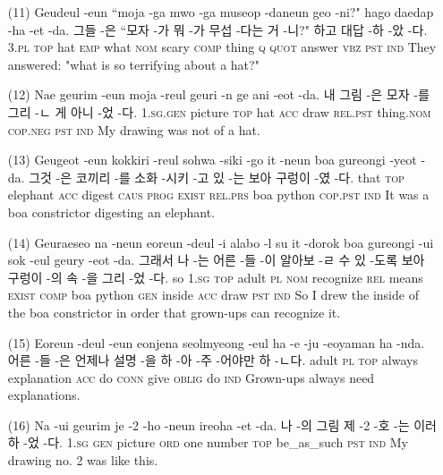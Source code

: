 \begin{itemize}
\item [(11)]
\tgl
		{Geudeul -eun ``moja -ga mwo -ga museop -daneun geo -ni?" hago daedap -ha -et -da.}
		{그들 -은 ``모자 -가 뭐 -가 무섭 -다는 거 -니?" 하고 대답 -하 -았 -다.}
		{\textsc{3.pl} \textsc{top} hat \textsc{emp} what \textsc{nom} scary \textsc{comp} thing \textsc{q} \textsc{quot} answer \textsc{vbz} \textsc{pst} \textsc{ind}}
		{They answered: "what is so terrifying about a hat?"}

\item [(12)]
\tgl
		{Nae geurim -eun moja -reul geuri -n ge ani -eot -da.}
		{내 그림 -은 모자 -를 그리 -ㄴ 게 아니 -었 -다.}
		{\textsc{1.sg.gen} picture \textsc{top} hat \textsc{acc} draw \textsc{rel.pst} thing.\textsc{nom} \textsc{cop.neg} \textsc{pst} \textsc{ind}}
		{My drawing was not of a hat.}

\item [(13)]
\tgl
		{Geugeot -eun kokkiri -reul sohwa -siki -go it -neun boa gureongi -yeot -da.}
		{그것 -은 코끼리 -를 소화 -시키 -고 있 -는 보아 구렁이 -였 -다.}
		{that \textsc{top} elephant \textsc{acc} digest \textsc{caus} \textsc{prog} \textsc{exist} \textsc{rel.prs} boa python \textsc{cop.pst} \textsc{ind}}
		{It was a boa constrictor digesting an elephant.}

\item [(14)]
\tgl
		{Geuraeseo na -neun eoreun -deul -i alabo -l su it -dorok boa gureongi -ui sok -eul geury -eot -da.}
		{그래서 나 -는 어른 -들 -이 알아보 -ㄹ 수 있 -도록 보아 구렁이 -의 속 -을 그리 -었 -다.}
		{so \textsc{1.sg} \textsc{top} adult \textsc{pl} \textsc{nom} recognize \textsc{rel} means \textsc{exist} \textsc{comp} boa python \textsc{gen} inside \textsc{acc} draw \textsc{pst} \textsc{ind}}
		{So I drew the inside of the boa constrictor in order that grown-ups can recognize it.}

\item [(15)]
\tgl
		{Eoreun -deul -eun eonjena seolmyeong -eul ha -e -ju -eoyaman ha -nda.}
		{어른 -들 -은 언제나 설명 -을 하 -아 -주 -어야만 하 -ㄴ다.}
		{adult \textsc{pl} \textsc{top} always explanation \textsc{acc} do \textsc{conn} give \textsc{oblig} do \textsc{ind}}
		{Grown-ups always need explanations.}

\item [(16)]
\tgl
		{Na -ui geurim je -2 -ho -neun ireoha -et -da.}
		{나 -의 그림 제 -2 -호 -는 이러하 -었 -다.}
		{\textsc{1.sg} \textsc{gen} picture \textsc{ord} one number \textsc{top} be\_as\_such \textsc{pst} \textsc{ind}}
		{My drawing no. 2 was like this.}


\end{itemize}
